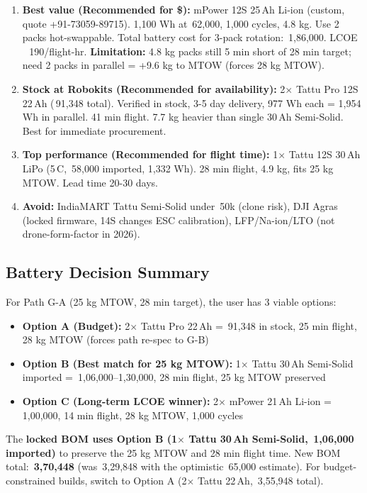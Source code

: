 \documentclass[11pt,a4paper]{article}
\newcommand{\Rs}{\rupee\,}
\begin{document}
\begin{enumerate}
  \item \textbf{Best value (Recommended for \$):} mPower 12S 25\,Ah Li-ion (custom, quote +91-73059-89715). 1,100 Wh at \Rs{}62,000, 1,000 cycles, 4.8 kg. Use 2 packs hot-swappable. Total battery cost for 3-pack rotation: \Rs{}1,86,000. LCOE ~\Rs{}190/flight-hr. \textbf{Limitation:} 4.8 kg packs still 5 min short of 28 min target; need 2 packs in parallel = +9.6 kg to MTOW (forces 28 kg MTOW).
  \item \textbf{Stock at Robokits (Recommended for availability):} 2$\times$ Tattu Pro 12S 22\,Ah (\Rs{}91,348 total). Verified in stock, 3-5 day delivery, 977 Wh each = 1,954 Wh in parallel. 41 min flight. 7.7 kg heavier than single 30\,Ah Semi-Solid. Best for immediate procurement.
  \item \textbf{Top performance (Recommended for flight time):} 1$\times$ Tattu 12S 30\,Ah LiPo (5\,C, \Rs{}58,000 imported, 1,332 Wh). 28 min flight, 4.9 kg, fits 25 kg MTOW. Lead time 20-30 days.
  \item \textbf{Avoid:} IndiaMART Tattu Semi-Solid under \Rs{}50k (clone risk), DJI Agras (locked firmware, 14S changes ESC calibration), LFP/Na-ion/LTO (not drone-form-factor in 2026).
\end{enumerate}

\subsection{Battery Decision Summary}

For Path G-A (25 kg MTOW, 28 min target), the user has 3 viable options:

\begin{itemize}
  \item \textbf{Option A (Budget):} 2$\times$ Tattu Pro 22\,Ah = \Rs{}91,348 in stock, 25 min flight, 28 kg MTOW (forces path re-spec to G-B)
  \item \textbf{Option B (Best match for 25 kg MTOW):} 1$\times$ Tattu 30\,Ah Semi-Solid imported = \Rs{}1,06,000--1,30,000, 28 min flight, 25 kg MTOW preserved
  \item \textbf{Option C (Long-term LCOE winner):} 2$\times$ mPower 21\,Ah Li-ion = \Rs{}1,00,000, 14 min flight, 28 kg MTOW, 1,000 cycles
\end{itemize}

The \textbf{locked BOM uses Option B (1$\times$ Tattu 30\,Ah Semi-Solid, \Rs{}1,06,000 imported)} to preserve the 25 kg MTOW and 28 min flight time. New BOM total: \textbf{\Rs{}3,70,448} (was \Rs{}3,29,848 with the optimistic \Rs{}65,000 estimate). For budget-constrained builds, switch to Option A (2$\times$ Tattu 22\,Ah, \Rs{}3,55,948 total).
\end{document}

